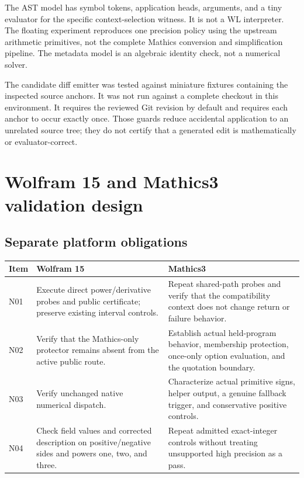 \documentclass[11pt,letterpaper]{article}
\begin{document}
The AST model has symbol tokens, application heads, arguments, and a tiny evaluator for the specific context-selection witness. It is not a WL interpreter. The floating experiment reproduces one precision policy using the upstream arithmetic primitives, not the complete Mathics conversion and simplification pipeline. The metadata model is an algebraic identity check, not a numerical solver.

The candidate diff emitter was tested against miniature fixtures containing the inspected source anchors. It was not run against a complete checkout in this environment. It requires the reviewed Git revision by default and requires each anchor to occur exactly once. Those guards reduce accidental application to an unrelated source tree; they do not certify that a generated edit is mathematically or evaluator-correct.

\section{Wolfram 15 and Mathics3 validation design}
\label{sec:runtime}
\subsection{Separate platform obligations}

\begin{tabularx}{\textwidth}{@{}P{1.05in}Y Y@{}}
\toprule
Item & Wolfram 15 & Mathics3\\\midrule
N01 & Execute direct power/derivative probes and public certificate; preserve existing interval controls. & Repeat shared-path probes and verify that the compatibility context does not change return or failure behavior.\\[5pt]
N02 & Verify that the Mathics-only protector remains absent from the active public route. & Establish actual held-program behavior, membership protection, once-only option evaluation, and the quotation boundary.\\[5pt]
N03 & Verify unchanged native numerical dispatch. & Characterize actual primitive signs, helper output, a genuine fallback trigger, and conservative positive controls.\\[5pt]
N04 & Check field values and corrected description on positive/negative sides and powers one, two, and three. & Repeat admitted exact-integer controls without treating unsupported high precision as a pass.\\
\bottomrule
\end{tabularx}
\end{document}
